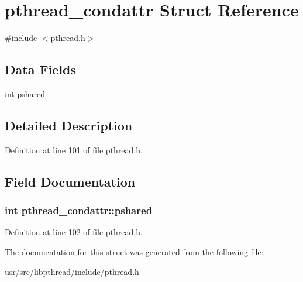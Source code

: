 \hypertarget{structpthread__condattr}{\section{pthread\+\_\+condattr Struct Reference}
\label{structpthread__condattr}
}


{\ttfamily \#include $<$pthread.\+h$>$}

\subsection*{Data Fields}
\begin{DoxyCompactItemize}
\item 
int \hyperlink{structpthread__condattr_a2cf7aea8228b9cee52cc0eccc4492fd7}{pshared}
\end{DoxyCompactItemize}


\subsection{Detailed Description}


Definition at line 101 of file pthread.\+h.



\subsection{Field Documentation}
\hypertarget{structpthread__condattr_a2cf7aea8228b9cee52cc0eccc4492fd7}{
\subsubsection[{pshared}]{\setlength{\rightskip}{0pt plus 5cm}int pthread\+\_\+condattr\+::pshared}}\label{structpthread__condattr_a2cf7aea8228b9cee52cc0eccc4492fd7}


Definition at line 102 of file pthread.\+h.



The documentation for this struct was generated from the following file\+:\begin{DoxyCompactItemize}
\item 
usr/src/libpthread/include/\hyperlink{pthread_8h}{pthread.\+h}\end{DoxyCompactItemize}
